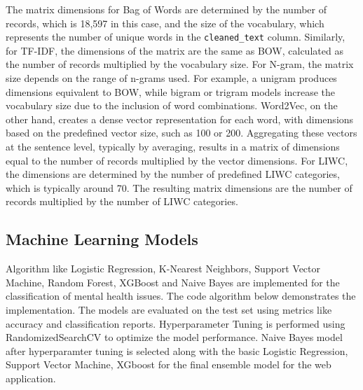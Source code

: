 \noindent
The matrix dimensions for Bag of Words are determined by the number of records, which is 18,597 in this case, and the size of the vocabulary, which represents the number of unique words in the \texttt{cleaned\_text} column. Similarly, for TF-IDF, the dimensions of the matrix are the same as BOW, calculated as the number of records multiplied by the vocabulary size. For N-gram, the matrix size depends on the range of n-grams used. For example, a unigram produces dimensions equivalent to BOW, while bigram or trigram models increase the vocabulary size due to the inclusion of word combinations. Word2Vec, on the other hand, creates a dense vector representation for each word, with dimensions based on the predefined vector size, such as 100 or 200. Aggregating these vectors at the sentence level, typically by averaging, results in a matrix of dimensions equal to the number of records multiplied by the vector dimensions. For LIWC, the dimensions are determined by the number of predefined LIWC categories, which is typically around 70. The resulting matrix dimensions are the number of records multiplied by the number of LIWC categories.


\subsection{Machine Learning Models}

Algorithm like Logistic Regression, K-Nearest Neighbors, Support Vector Machine, Random Forest, XGBoost and Naive Bayes are implemented for the classification of mental health issues. The code algorithm below demonstrates the implementation. The models are evaluated on the test set using metrics like accuracy and classification reports. Hyperparameter Tuning is performed using RandomizedSearchCV to optimize the model performance. Naive Bayes model after hyperparamter tuning is selected along with the basic Logistic Regression, Support Vector Machine, XGboost for the final ensemble model for the web application. 

